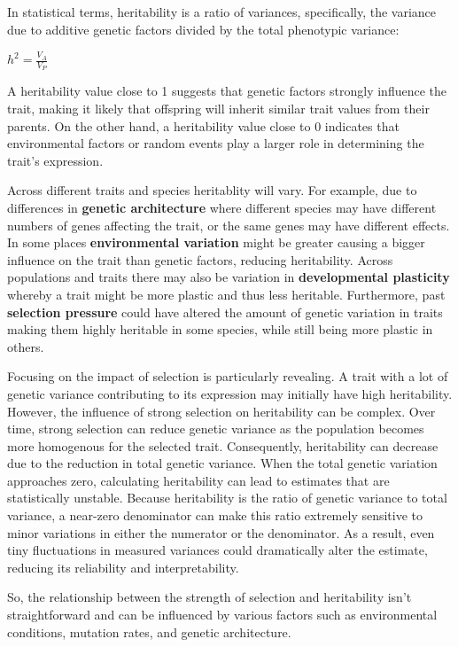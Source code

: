 \documentclass[
  a4paper]{book}
\begin{document}
In statistical terms, heritability is a ratio of variances, specifically, the variance due to additive genetic factors divided by the total phenotypic variance:

\(h^2 = \frac{V_A}{V_P}\)

A heritability value close to 1 suggests that genetic factors strongly influence the trait, making it likely that offspring will inherit similar trait values from their parents. On the other hand, a heritability value close to 0 indicates that environmental factors or random events play a larger role in determining the trait's expression.

Across different traits and species heritablity will vary. For example, due to differences in \textbf{genetic architecture} where different species may have different numbers of genes affecting the trait, or the same genes may have different effects. In some places \textbf{environmental variation} might be greater causing a bigger influence on the trait than genetic factors, reducing heritability. Across populations and traits there may also be variation in \textbf{developmental plasticity} whereby a trait might be more plastic and thus less heritable. Furthermore, past \textbf{selection pressure} could have altered the amount of genetic variation in traits making them highly heritable in some species, while still being more plastic in others.

Focusing on the impact of selection is particularly revealing. A trait with a lot of genetic variance contributing to its expression may initially have high heritability. However, the influence of strong selection on heritability can be complex. Over time, strong selection can reduce genetic variance as the population becomes more homogenous for the selected trait. Consequently, heritability can decrease due to the reduction in total genetic variance. When the total genetic variation approaches zero, calculating heritability can lead to estimates that are statistically unstable. Because heritability is the ratio of genetic variance to total variance, a near-zero denominator can make this ratio extremely sensitive to minor variations in either the numerator or the denominator. As a result, even tiny fluctuations in measured variances could dramatically alter the estimate, reducing its reliability and interpretability.

So, the relationship between the strength of selection and heritability isn't straightforward and can be influenced by various factors such as environmental conditions, mutation rates, and genetic architecture.
\end{document}
